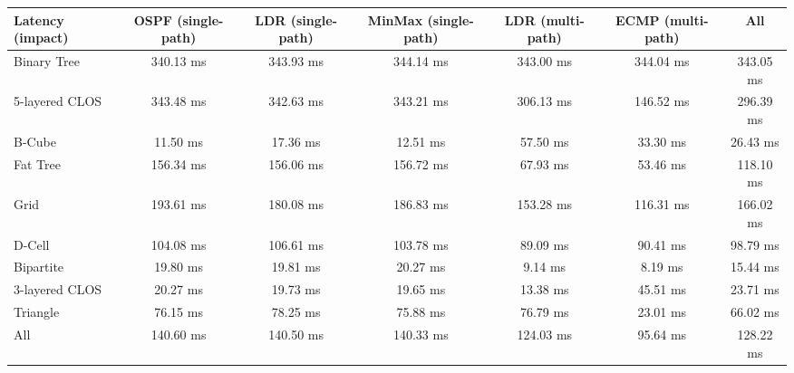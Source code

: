\begin{tabular}{l|cccccc}
Latency (impact) & OSPF (single-path) & LDR (single-path) & MinMax (single-path) & LDR (multi-path) & ECMP (multi-path) & All       \\
\hline
Binary Tree      & 340.13 ms          & 343.93 ms         & 344.14 ms            & 343.00 ms        & 344.04 ms         & 343.05 ms \\
5-layered CLOS   & 343.48 ms          & 342.63 ms         & 343.21 ms            & 306.13 ms        & 146.52 ms         & 296.39 ms \\
B-Cube           & 11.50 ms           & 17.36 ms          & 12.51 ms             & 57.50 ms         & 33.30 ms          & 26.43 ms  \\
Fat Tree         & 156.34 ms          & 156.06 ms         & 156.72 ms            & 67.93 ms         & 53.46 ms          & 118.10 ms \\
Grid             & 193.61 ms          & 180.08 ms         & 186.83 ms            & 153.28 ms        & 116.31 ms         & 166.02 ms \\
D-Cell           & 104.08 ms          & 106.61 ms         & 103.78 ms            & 89.09 ms         & 90.41 ms          & 98.79 ms  \\
Bipartite        & 19.80 ms           & 19.81 ms          & 20.27 ms             & 9.14 ms          & 8.19 ms           & 15.44 ms  \\
3-layered CLOS   & 20.27 ms           & 19.73 ms          & 19.65 ms             & 13.38 ms         & 45.51 ms          & 23.71 ms  \\
Triangle         & 76.15 ms           & 78.25 ms          & 75.88 ms             & 76.79 ms         & 23.01 ms          & 66.02 ms  \\
All              & 140.60 ms          & 140.50 ms         & 140.33 ms            & 124.03 ms        & 95.64 ms          & 128.22 ms \\
\end{tabular}